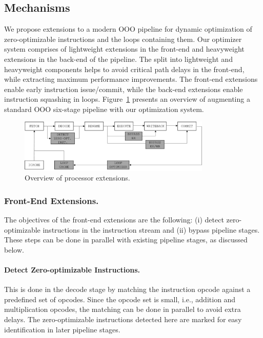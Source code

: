 \subsection{Mechanisms}

We propose extensions to a modern OOO pipeline for dynamic optimization of zero-optimizable instructions and the loops containing them.  Our optimizer system comprises of lightweight extensions in the front-end and heavyweight extensions in the back-end of the pipeline.  The split into lightweight and heavyweight components helps to avoid critical path delays in the front-end, while extracting maximum performance improvements.  The front-end extensions enable early instruction issue/commit, while the back-end extensions enable instruction squashing in loops.  Figure~\ref{fig:opt_pipeline} presents an overview of augmenting a standard OOO six-stage pipeline with our optimization system.

\begin{figure}
\centering
\includegraphics[height=1in]{Figures/pipeline.png}
\caption{Overview of processor extensions.}
\label{fig:opt_pipeline}
\end{figure}

\subsubsection{Front-End Extensions.}
The objectives of the front-end extensions are the following: (i) detect zero-optimizable instructions in the instruction stream and (ii) bypass pipeline stages.  These steps can be done in parallel with existing pipeline stages, as discussed below.  

\paragraph{Detect Zero-optimizable Instructions.}
This is done in the decode stage by matching the instruction opcode against a predefined set of opcodes. Since the opcode set is small, i.e., addition and multiplication opcodes, the matching can be done in parallel to avoid extra delays.  The zero-optimizable instructions detected here are marked for easy identification in later pipeline stages. 

